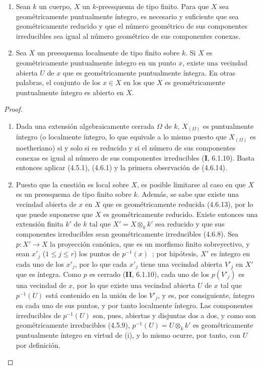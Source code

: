\begin{proposition}[4.6.15]
\label{IV.2.4.6.15-fr}
\begin{enumerate}
\item[\textup{(i)}] Sean $k$ un cuerpo, $X$ un $k$-preesquema de tipo finito. Para que
$X$ sea geométricamente puntualmente íntegro, es necesario y suficiente que
sea geométricamente reducido y que el número geométrico de sus componentes
irreducibles sea igual al número geométrico de sus componentes conexas.
\item[\textup{(ii)}] Sea $X$ un preesquema localmente de tipo finito sobre $k$. Si $X$
es geométricamente puntualmente íntegro en un punto $x$, existe una vecindad
abierta $U$ de $x$ que es geométricamente puntualmente íntegra. En otras
palabras, el conjunto de los $x\in X$ en los que $X$ es geométricamente
puntualmente íntegro es abierto en $X$.
\end{enumerate}
\end{proposition}

\begin{proof}
\begin{enumerate}
\item[(i)] Dada una extensión algebraicamente cerrada $\Omega$ de $k$,
$X_{(\Omega)}$ es puntualmente íntegro (o localmente íntegro, lo que equivale a
lo mismo puesto que $X_{(\Omega)}$ es noetheriano) si y solo si es reducido y
si el número de sus componentes conexas es igual al número de sus componentes
irreducibles (\textbf I, 6.1.10). Basta entonces aplicar (4.5.1), (4.6.1) y la primera
observación de (4.6.14).

\item[(ii)] Puesto que la cuestión es local sobre $X$, es posible limitarse al
caso en que $X$ es un preesquema de tipo finito sobre $k$. Además, se sabe que
existe una vecindad abierta de $x$ en $X$ que es geométricamente reducida
(4.6.13), por lo que puede suponerse que $X$ es geométricamente reducido.
Existe entonces una extensión finita $k'$ de $k$ tal que
$X'=X\otimes_k k'$ sea reducido y que sus componentes irreducibles sean
geométricamente irreducibles (4.6.8). Sea $p:X'\to X$ la proyección canónica,
que es un morfismo finito sobreyectivo, y sean $x'_j$
($1\leqslant j\leqslant r$) los puntos de $p^{-1}(x)$~; por hipótesis, $X'$ es
íntegro en cada uno de los $x'_j$, por lo que cada $x'_j$ tiene una vecindad
abierta $V'_j$ en $X'$ que es íntegra. Como $p$ es cerrado
(\textbf{II}, 6.1.10), cada
uno de los $p(V'_j)$ es una vecindad de $x$, por lo que existe una vecindad abierta
$U$ de $x$ tal que $p^{-1}(U)$ está contenido en la unión de los $V'_j$, y es,
por consiguiente, íntegro en cada uno de sus puntos, y por tanto localmente
íntegro. Las componentes irreducibles de $p^{-1}(U)$ son, pues, abiertas y
disjuntas dos a dos, y como son geométricamente irreducibles (4.5.9),
$p^{-1}(U)=U\otimes_k k'$ es geométricamente puntualmente íntegro en virtud de
(i), y lo mismo ocurre, por tanto, con $U$ por definición.
\end{enumerate}
\end{proof}

